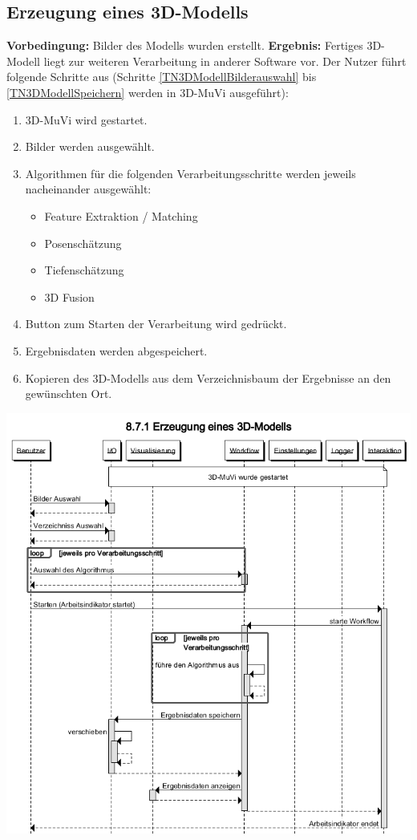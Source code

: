 \subsection{Erzeugung eines 3D-Modells}
\textbf{Vorbedingung:} Bilder des Modells wurden erstellt. \newline
\textbf{Ergebnis:} Fertiges 3D-Modell liegt zur weiteren Verarbeitung in anderer Software vor. \newline
Der Nutzer führt folgende Schritte aus (Schritte \ref{TN3DModellBilderauswahl} bis \ref{TN3DModellSpeichern} werden in 3D-MuVi ausgeführt):
\begin{enumerate}
	\item 3D-MuVi wird gestartet.
	\item \label{TN3DModellBilderauswahl} Bilder werden ausgewählt.
	\item Algorithmen für die folgenden Verarbeitungsschritte werden jeweils nacheinander ausgewählt:
	\begin{itemize}
		\item Feature Extraktion / Matching
		\item Posenschätzung
		\item Tiefenschätzung
		\item 3D Fusion
	\end{itemize}
	\item Button zum Starten der Verarbeitung wird gedrückt.
	\item \label{TN3DModellSpeichern} Ergebnisdaten werden abgespeichert.
	\item Kopieren des 3D-Modells aus dem Verzeichnisbaum der Ergebnisse an den gewünschten Ort.
\end{enumerate}
\includegraphics[width=1.05\textwidth]{img/871_Seqz.png} 

